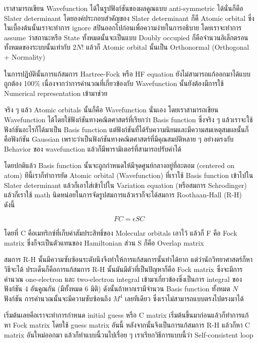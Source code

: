 เราสามารถเขียน Wavefunction ได้ในรูปฟังก์ชันของผลคูณแบบ anti-symmetric ได้นั่นก็คือ Slater determinant 
โดยองค์ประกอบสำคัญของ Slater determinant ก็คื Atomic orbital ซึ่งในเบื้องต้นนั้นเราจะทำการ ignore 
สปินออกไปก่อนเพื่อความง่ายในการอธิบาย โดยเราจะทำการ assume ว่าสถานะหรือ State ทั้งหมดนั้นจะเป็นแบบ 
Doubly occupied ก็คือจำนวนอิเล็กตรอนทั้งหมดของระบบนั้นเท่ากับ $2N!$ แล้วก็ Atomic orbital 
นั้นเป็น Orthonormal (Orthogonal + Normality) 

ในการปฏิบัตินั้นการแก้สมการ Hartree-Fock หรือ HF equation ยังไม่สามารถแก้ออกมาได้แบบถูกต้อง 100\% 
เนื่องจากว่าการคำนวณที่เกี่ยวข้องกับ Wavefunction นั้นยังต้องมีการใช้ Numerical representation เข้ามาช่วย 

จริง ๆ แล้ว Atomic orbitals นั้นก็คือ Wavefunction นั่นเอง โดยเราสามารถเขียน Wavefunction 
ได้โดยใช้ฟังก์ชันทางคณิตศาสตร์ที่เรียกว่า Basis function ซึ่งจริง ๆ แล้วเราจะใช้ฟังก์ชันอะไรก็ได้มาเป็น 
Basis function แต่ฟังก์ชันที่ได้รับความนิยมและมีความสมเหตุสมผลนั้นก็คือฟังก์ชัน Gaussian 
เพราะว่าเป็นฟังก์ชันทางคณิตศาสตร์ที่มีคุณสมบัติหลาย ๆ อย่างตรงกับ Behavior ของ wavefunction 
แล้วก็มีพารามิเตอร์ที่สามารถปรับค่าได้

โดยปกติแล้ว Basis function นั้นจะถูกกำหนดให้มีจุดศูนย์กลางอยู่ที่อะตอม (centered on atom) 
ทีนี้เราก็ทำการยัด Atomic orbital (Wavefunction) ที่เราใช้ Basis function เข้าไปใน Slater 
determinant แล้วก็เอาใส่เข้าไปใน Variation equation (หรือสมการ Schrodinger) 
แล้วก็เราใช้ math นิดหน่อยในการจัดรูปสมการแล้วเราก็จะได้สมการ Roothaan-Hall (R-H) ดังนี้ 

\begin{equation}
    FC = \epsilon SC
\end{equation}

โดยที่ C คือเมทริกซ์ที่เก็บค่าสัมประสิทธิ์ของ Molecular orbitals เอาไว้ แล้วก็ F คือ Fock matrix 
ซึ่งก็จะเป็นตัวแทนของ Hamiltonian ส่วน S ก็คือ Overlap matrix 

สมการ R-H นั้นมีความซับซ้อนระดับนึงจึงทำให้การแก้สมการนั้นทำได้ยาก แต่ว่านักวิทยาศาสตร์ก็หาวิธีจะได้ 
ประเด็นก็คือการแก้สมการ R-H นั้นมันมีตัวที่เป็นปัญหาก็คือ Fock matrix ซึ่งจะมีการคำนวณ one-electron 
และ two-electron integral เข้ามาเกี่ยวข้องซึ่งเป็นการ integral ของฟังก์ชัน 4 อันคูณกัน
(มีทั้งหมด 6 มิติ) ดังนั้นถ้าหากเรามีจำนวน Basis function ทั้งหมด $N$ ฟังก์ชัน 
การคำนวณนั้นจะมีความซับซ้อนถึง $M^{4}$ เลยทีเดียว ซึ่งเราไม่สามารถแบบตรงไปตรงมาได้ 

เริ่มต้นเลยคือเราจะทำการกำหนด initial guess หรือ C matrix เริ่มต้นขึ้นมาก่อนแล้วก็ทำการแก้หา 
Fock matrix โดยใช้ guess matrix อันนี้ หลังจากนั้นจึงเป็นการแก้สมการ R-H แล้วก็หา C matrix 
อันใหม่ออกมา แล้วก็ทำแบบนี้วนไปเรื่อย ๆ เราเรียกวิธีการแบบนี้ว่า Self-consistent loop

